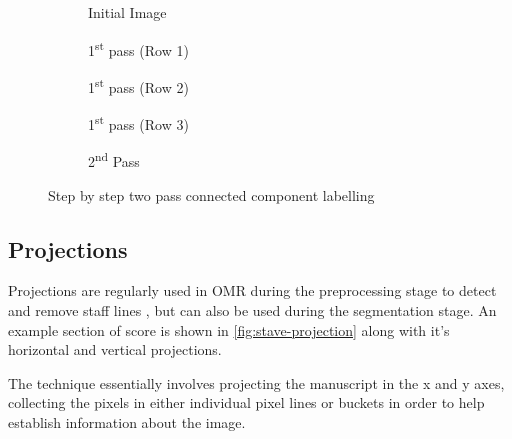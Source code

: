 \begin{figure}[h!]
    \centering
    \begin{subfigure}[b]{\linewidth}
        \centering
        
        \caption{Initial Image}
    \end{subfigure}

    \vspace*{0.5in}

    \begin{subfigure}[b]{.3\linewidth}
        \centering
        
        \caption{1\textsuperscript{st} pass (Row 1)}
    \end{subfigure}
    \begin{subfigure}[b]{.3\linewidth}
        \centering
        
        \caption{1\textsuperscript{st} pass (Row 2)}
    \end{subfigure}
    \begin{subfigure}[b]{.3\linewidth}
        \centering
        
        \caption{1\textsuperscript{st} pass (Row 3)}
    \end{subfigure}

    \vspace*{0.5in}

    \begin{subfigure}[b]{.6\linewidth}
        \centering
        
        \caption{2\textsuperscript{nd} Pass}
    \end{subfigure}

  \caption{Step by step two pass connected component labelling}
  \label{fig:ccl-two-pass}
\end{figure}


\subsection{Projections}
\label{sec:projections}

Projections are regularly used in OMR during the preprocessing stage to detect and remove staff lines \parencite{rossant2002global}, but can also be used during the segmentation stage. An example section of score is shown in \cref{fig:stave-projection} along with it's horizontal and vertical projections.

The technique essentially involves projecting the manuscript in the x and y axes, collecting the pixels in either individual pixel lines or buckets in order to help establish information about the image.

